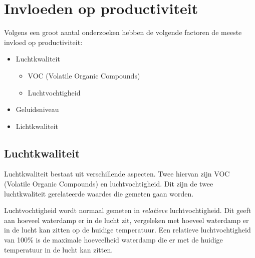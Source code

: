 
\section{Invloeden op productiviteit} \label{sec:theory}
Volgens een groot aantal onderzoeken hebben de volgende factoren de meeste invloed op productiviteit\cite{comfort-grootheden}:
\begin{itemize}
    \item Luchtkwaliteit
    \begin{itemize}
        \item VOC (Volatile Organic Compounds)
        \item Luchtvochtigheid
    \end{itemize}
    \item Geluidsniveau
    \item Lichtkwaliteit
\end{itemize}


\subsection{Luchtkwaliteit}
Luchtkwaliteit bestaat uit verschillende aspecten. Twee hiervan zijn VOC (Volatile Organic Compounds) en luchtvochtigheid\cite{comfort-grootheden}\cite{luchtkwal-is-voc-denk-ik-misschien}. Dit zijn de twee luchtkwaliteit gerelateerde waardes die gemeten gaan worden.

Luchtvochtigheid wordt normaal gemeten in \textit{relatieve} luchtvochtigheid. Dit geeft aan hoeveel waterdamp er in de lucht zit, vergeleken met hoeveel waterdamp er in de lucht kan zitten op de huidige temperatuur. Een relatieve luchtvochtigheid van 100\% is de maximale hoeveelheid waterdamp die er met de huidige temperatuur in de lucht kan zitten. 

